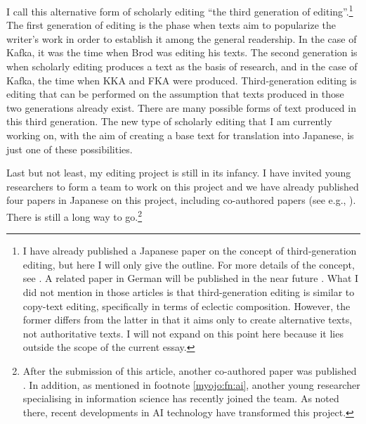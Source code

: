 \begin{paper}
I call this alternative form of scholarly editing ``the third generation
of editing''.\footnote{I have already published a Japanese paper on the
  concept of third-generation editing, but here I will only give the
  outline. For more details of the concept, see \cite{myojo_daisansedai_2021}. A related paper in German will be published in the near future \citep[see][]{myojo_editionspraxis_forthcoming}. What I did
  not mention in those articles is that third-generation editing is
  similar to copy-text editing, specifically in terms of eclectic
  composition. However, the former differs from the latter in that it
  aims only to create alternative texts, not authoritative texts. I will
  not expand on this point here because it lies outside the scope of the
  current essay.} The first generation of editing is the phase when
texts aim to popularize the writer's work in order to establish it among
the general readership. In the case of Kafka, it was the time when Brod
was editing his texts. The second generation is when scholarly
editing produces a text as the basis of research, and in the case of
Kafka, the time when KKA and FKA were produced. Third-generation editing
is editing that can be performed on the assumption that texts produced
in those two generations already exist. There are many possible forms of
text produced in this third generation. The new type of scholarly
editing that I am currently working on, with the aim of creating a base
text for translation into Japanese, is just one of these possibilities.

Last but not least, my editing project is still in its infancy. I have
invited young researchers to form a team to work on this project and we
have already published four papers in Japanese on this project,
including co-authored papers (see e.g., \cite{myojo_honyakukano_2019,myojo_taiho_2021}).
There is still a long way to go.\footnote{After the submission of this article, another co-authored paper was published \citep[see][]{myojo_grubach_2022}. In addition, as mentioned in footnote \ref{myojo:fn:ai}, another young researcher specialising in information science has recently joined the team. As noted there, recent developments in AI technology have transformed this project.}


\end{paper}
